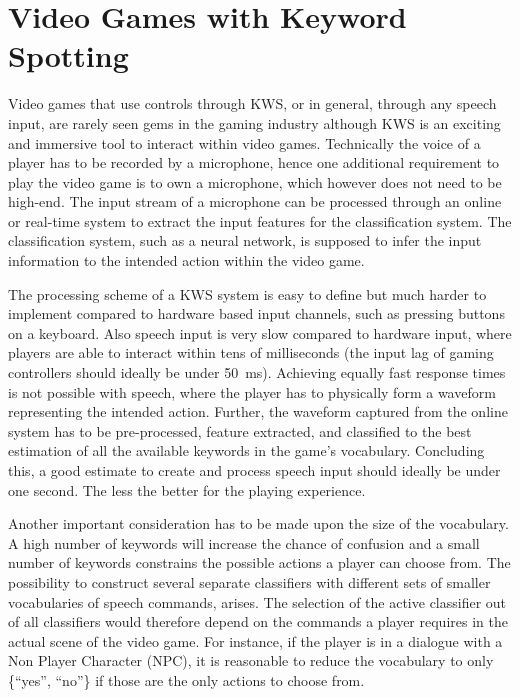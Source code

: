 
\section{Video Games with Keyword Spotting}\label{sec:intro_games}
Video games that use controls through KWS, or in general, through any speech input, are rarely seen gems in the gaming industry although KWS is an exciting and immersive tool to interact within video games.
Technically the voice of a player has to be recorded by a microphone, hence one additional requirement to play the video game is to own a microphone, which however does not need to be high-end.
The input stream of a microphone can be processed through an online or real-time system to extract the input features for the classification system.
The classification system, such as a neural network, is supposed to infer the input information to the intended action within the video game.

The processing scheme of a KWS system is easy to define but much harder to implement compared to hardware based input channels, such as pressing buttons on a keyboard.
Also speech input is very slow compared to hardware input, where players are able to interact within tens of milliseconds (the input lag of gaming controllers should ideally be under \SI{50}{\milli\second}).
Achieving equally fast response times is not possible with speech, where the player has to physically form a waveform representing the intended action.
Further, the waveform captured from the online system has to be pre-processed, feature extracted, and classified to the best estimation of all the available keywords in the game's vocabulary.
Concluding this, a good estimate to create and process speech input should ideally be under one second. 
The less the better for the playing experience.

Another important consideration has to be made upon the size of the vocabulary.
A high number of keywords will increase the chance of confusion and a small number of keywords constrains the possible actions a player can choose from.
The possibility to construct several separate classifiers with different sets of smaller vocabularies of speech commands, arises.
The selection of the active classifier out of all classifiers would therefore depend on the commands a player requires in the actual scene of the video game.
For instance, if the player is in a dialogue with a Non Player Character (NPC), it is reasonable to reduce the vocabulary to only \{\enquote{yes}, \enquote{no}\} if those are the only actions to choose from.

